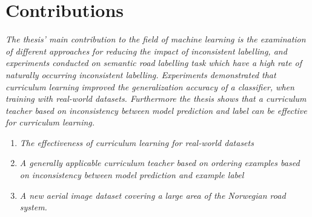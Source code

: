 \section{Contributions}
\label{sec:IntroContributions}
{\it
The thesis' main contribution to the field of machine learning  is the examination of different approaches for reducing the impact of inconsistent labelling, and experiments conducted on semantic road labelling task which have a high rate of naturally occurring inconsistent labelling. Experiments demonstrated that curriculum learning improved the generalization accuracy of a classifier, when training with real-world datasets. Furthermore the thesis shows that a curriculum teacher based on inconsistency between model prediction and label can be effective for curriculum learning.}

\begin{enumerate}
\item {\it The effectiveness of curriculum learning for real-world datasets}
\item {\it A generally applicable curriculum teacher based on ordering examples based on inconsistency between model prediction and example label}
\item {\it A new aerial image dataset covering a large area of the Norwegian road system.}
\end{enumerate}